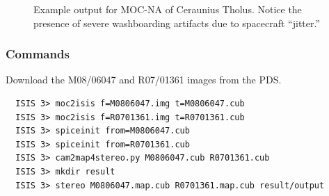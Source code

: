 \begin{figure}[h]
\centering
  \hfil
\caption{Example output for MOC-NA of Ceraunius Tholus. Notice the presence of severe washboarding artifacts due to spacecraft ``jitter.''}
\label{fig:mocna_ceraunius_example}
\end{figure}

\subsubsection*{Commands}

Download the M08/06047 and R07/01361 images from the \ac{PDS}.

\begin{verbatim}
  ISIS 3> moc2isis f=M0806047.img t=M0806047.cub
  ISIS 3> moc2isis f=R0701361.img t=R0701361.cub
  ISIS 3> spiceinit from=M0806047.cub
  ISIS 3> spiceinit from=R0701361.cub
  ISIS 3> cam2map4stereo.py M0806047.cub R0701361.cub
  ISIS 3> mkdir result
  ISIS 3> stereo M0806047.map.cub R0701361.map.cub result/output
\end{verbatim}

